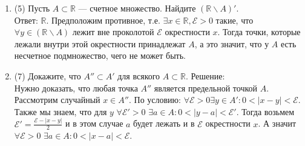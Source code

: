 \documentclass[a4paper]{article}
\begin{document}
\begin{enumerate}
	\item (5) Пусть $A\subset \mathbb R$ --- счетное множество. Найдите $(\mathbb R\smallsetminus A)'$.\\
Ответ: $\mathbb R$. Предположим противное, т.е. $\exists x \in \mathbb R, \mathcal{E} > 0$ такие, что $\forall y \in (\mathbb R\smallsetminus A)$ лежит вне проколотой $\mathcal{E}$ окрестности $x$. Тогда точки, которые лежали внутри этой окрестности принадлежат $A$, а это значит, что у $A$ есть несчетное подмножество, чего не может быть. 
	\item (7) Докажите, что $A''\subset A'$ для всякого $A\subset \mathbb R$.
    Решение:\\ 
    Нужно доказать, что любая точка $A''$ является предельной точкой $A$. Рассмотрим случайный $x \in A''$. По условию: $\forall \mathcal{E} > 0 \exists y \in A': 0 < |x - y| < \mathcal{E}$. Также мы знаем, что для $y$ $\forall \mathcal{E'} > 0$ $\exists a \in A: 0 < |y - a|<\mathcal{E'}$. Тогда возьмем $\mathcal{E'} = \frac{\mathcal{E} - |x-y|}{2}$ и в этом случае $a$ будет лежать и в $\mathcal{E}$ окрестности $x$. А значит $\forall \mathcal{E} > 0$ $\exists a \in A : 0 < |x-a| < \mathcal{E}$.
\end{enumerate}
\end{document}

